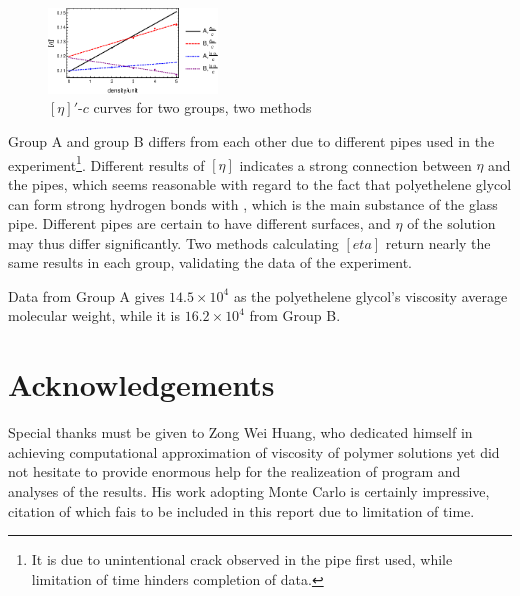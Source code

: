 \documentclass[%
 reprint,
 amsmath,amssymb,
 aps,
]{revtex4-1}
\begin{document}
\begin{figure}
\centering
\includegraphics[width=0.4\textwidth]{figures/eta.eps}
\caption{$[\eta]'$-$c$ curves for two groups, two methods}
\label{etafig}
\end{figure}
Group A and group B differs from each other due to different pipes used in the experiment\footnote{It is due to unintentional crack observed in the pipe first used, while limitation of time hinders completion of data.}. 
Different results of $[\eta]$ indicates a strong connection between $\eta$ and the pipes, which seems reasonable with regard to the fact that polyethelene glycol can form strong hydrogen bonds with , which is the main substance of the glass pipe. Different pipes are certain to have different surfaces, and $\eta$ of the solution may thus differ significantly. Two methods calculating $[eta]$ return nearly the same results in each group, validating the data of the experiment. 

Data from Group A gives $14.5\times10^4$ as the polyethelene glycol's viscosity average molecular weight, while it is $16.2\times10^4$ from Group B. 

\section{Acknowledgements}
Special thanks must be given to Zong Wei Huang, who dedicated himself in achieving computational approximation of viscosity of polymer solutions yet did not hesitate to provide enormous help for the realizeation of program and analyses of the results. His work adopting Monte Carlo is certainly impressive, citation of which fais to be included in this report due to limitation of time.
\end{document}
